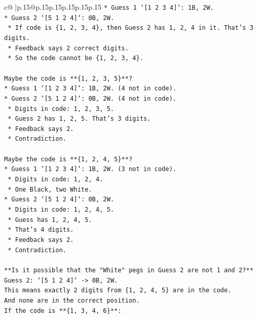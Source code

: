 \documentclass{article}
\begin{document}
{\begin{supertabular}{c@{$\;$}|p{.15\linewidth}@{}p{.15\linewidth}p{.15\linewidth}p{.15\linewidth}p{.15\linewidth}p{.15\linewidth}}
{{{\texttt{*   Guess 1 `{[}1 2 3 4{]}`: 1B, 2W.} \\
\texttt{*   Guess 2 `{[}5 1 2 4{]}`: 0B, 2W.} \\
\texttt{    *   If code is \{1, 2, 3, 4\}, then Guess 2 has 1, 2, 4 in it. That's 3 digits.} \\
\texttt{    *   Feedback says 2 correct digits.} \\
\texttt{    *   So the code cannot be \{1, 2, 3, 4\}.} \\
\\ 
\texttt{Maybe the code is **\{1, 2, 3, 5\}**?} \\
\texttt{*   Guess 1 `{[}1 2 3 4{]}`: 1B, 2W. (4 not in code).} \\
\texttt{*   Guess 2 `{[}5 1 2 4{]}`: 0B, 2W. (4 not in code).} \\
\texttt{    *   Digits in code: 1, 2, 3, 5.} \\
\texttt{    *   Guess 2 has 1, 2, 5. That's 3 digits.} \\
\texttt{    *   Feedback says 2.} \\
\texttt{    *   Contradiction.} \\
\\ 
\texttt{Maybe the code is **\{1, 2, 4, 5\}**?} \\
\texttt{*   Guess 1 `{[}1 2 3 4{]}`: 1B, 2W. (3 not in code).} \\
\texttt{    *   Digits in code: 1, 2, 4.} \\
\texttt{    *   One Black, two White.} \\
\texttt{*   Guess 2 `{[}5 1 2 4{]}`: 0B, 2W.} \\
\texttt{    *   Digits in code: 1, 2, 4, 5.} \\
\texttt{    *   Guess has 1, 2, 4, 5.} \\
\texttt{    *   That's 4 digits.} \\
\texttt{    *   Feedback says 2.} \\
\texttt{    *   Contradiction.} \\
\\ 
\texttt{**Is it possible that the "White" pegs in Guess 2 are not 1 and 2?**} \\
\texttt{Guess 2: `{[}5 1 2 4{]}` {-}> 0B, 2W.} \\
\texttt{This means exactly 2 digits from \{1, 2, 4, 5\} are in the code.} \\
\texttt{And none are in the correct position.} \\
\texttt{If the code is **\{1, 3, 4, 6\}**:} \\
}}}
\end{supertabular}}
\end{document}
